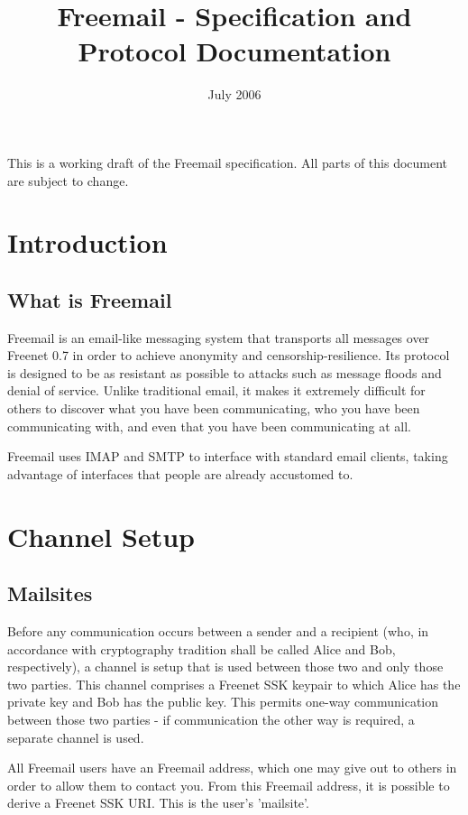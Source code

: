 \documentclass[12pt,a4paper]{article}
\begin{document}
\title{Freemail - Specification and Protocol Documentation}
\date{July 2006}
\maketitle

This is a working draft of the Freemail specification. All parts of this document are subject to change.

\section{Introduction}
\subsection{What is Freemail}
Freemail is an email-like messaging system that transports all messages over Freenet 0.7 in order to achieve anonymity and censorship-resilience. Its protocol is designed to be as resistant as possible to attacks such as message floods and denial of service. Unlike traditional email, it makes it extremely difficult for others to discover what you have been communicating, who you have been communicating with, and even that you have been communicating at all.

Freemail uses IMAP and SMTP to interface with standard email clients, taking advantage of interfaces that people are already accustomed to.

\section{Channel Setup}
\subsection{Mailsites}
Before any communication occurs between a sender and a recipient (who, in accordance with cryptography tradition shall be called Alice and Bob, respectively), a channel is setup that is used between those two and only those two parties. This channel comprises a Freenet SSK keypair to which Alice has the private key and Bob has the public key. This permits one-way communication between those two parties - if communication the other way is required, a separate channel is used.

All Freemail users have an Freemail address, which one may give out to others in order to allow them to contact you. From this Freemail address, it is possible to derive a Freenet SSK URI. This is the user's 'mailsite'.
\end{document}
